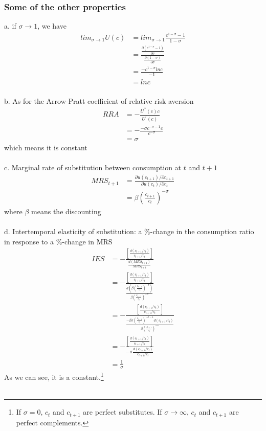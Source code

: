 \documentclass{article}
\begin{document}
\subsubsection{Some of the other properties}
a. if $\sigma \to 1$, we have
\begin{align*}
	lim_{\sigma \to 1}U(c) &= lim_{\sigma \to 1}\frac{c^{1 - \sigma} - 1}{1 - \sigma}\\
	&= \frac{\frac{\partial (c^{1 - \sigma} - 1)}{\partial \sigma}}{\frac{\partial (1 - \sigma)}{\partial \sigma}}\\
	&= \frac{-c^{1-\sigma} lnc}{-1}\\
	&= lnc
\end{align*}\\
b. As for the Arrow-Pratt coefficient of relative risk aversion
\begin{align*}
	RRA &= -\frac{U^{\prime \prime}(c)c}{U^\prime(c)}\\
	&= -\frac{-\sigma c^{-\sigma -1}c}{c^{-\sigma}}\\
	&= \sigma
\end{align*}
which means it is constant\\\\
c. Marginal rate of substitution between consumption at $t$ and $t+1$
\begin{align*}
	MRS_{t+1} &= \frac{\partial u(c_{t+1})/ \partial c_{t+1}}{\partial u(c_t) / \partial c_t}\\
	&= \beta (\frac{c_{t+1}}{c_t})^{-\sigma}
\end{align*}
where $\beta$ means the discounting\\\\
d. Intertemporal elasticity of substitution: a $\%$-change in the consumption ratio in response to a $\%$-change in MRS
\begin{align*}
	IES &= -\frac{[\frac{d(c_{t+1}/c_t)}{c_{t+1}/c_t}]}{\frac{d(MRS_{t+1})}{MRS_{t+1}}}\\
	&= -\frac{[\frac{d(c_{t+1}/c_t)}{c_{t+1}/c_t}]}{\frac{d(\beta (\frac{c_{t+1}}{c_t})^{-\sigma})}{\beta (\frac{c_{t+1}}{c_t})^{-\sigma}}}\\
	&= -\frac{[\frac{d(c_{t+1}/c_t)}{c_{t+1}/c_t}]}{\frac{-\beta \sigma (\frac{c_{t+1}}{c_t})^{-\sigma-1}d(c_{t+1}/c_t)}{\beta (\frac{c_{t+1}}{c_t})^{-\sigma}}}\\
	&= -\frac{[\frac{d(c_{t+1}/c_t)}{c_{t+1}/c_t}]}{-\sigma\frac{d(c_{t+1}/c_t)}{c_{t+1}/c_t}}\\
	&= \frac{1}{\sigma}
\end{align*}
As we can see, it is a constant.\footnote{If $\sigma = 0$, $c_t$ and $c_{t+1}$ are perfect substitutes. If $\sigma \to \infty$, $c_t$ and $c_{t+1}$ are perfect complements.}\\\\
\end{document}
